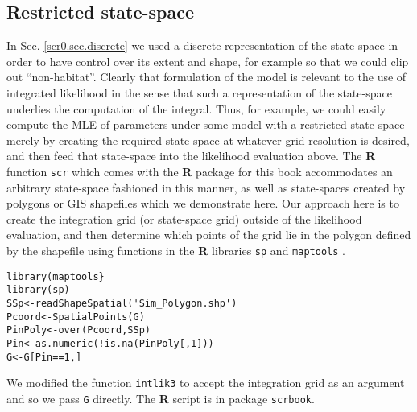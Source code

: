\subsection{Restricted state-space}
\label{mle.sec.shapefile}

In Sec. \ref{scr0.sec.discrete} 
 we used a discrete representation of
the state-space in order to have control over its extent and shape,
for example so that we could clip out ``non-habitat''. Clearly that
formulation of the model is relevant to the use of integrated
likelihood in the sense that such a representation of the state-space
underlies the computation of the integral. Thus, for example, we could
easily compute the MLE of parameters under some model with a
restricted state-space merely by creating the required state-space at
whatever grid resolution is desired, and then feed that state-space
into the likelihood evaluation above. The {\bf R} function \mbox{\tt scr}
which comes with the {\bf R} package for this book accommodates an
arbitrary state-space fashioned in this manner, as well as
state-spaces created by polygons or GIS shapefiles  which we
demonstrate here. Our approach here is to create the integration grid
(or state-space grid) outside of the likelihood evaluation, and then
determine which points of the grid lie in the polygon defined by the
shapefile using 
functions in the {\bf R} libraries \mbox{\tt sp}  and
\mbox{\tt maptools}  .
{\small
\begin{verbatim}
library(maptools}
library(sp)
SSp<-readShapeSpatial('Sim_Polygon.shp')
Pcoord<-SpatialPoints(G)
PinPoly<-over(Pcoord,SSp)
Pin<-as.numeric(!is.na(PinPoly[,1]))
G<-G[Pin==1,]
\end{verbatim}
}
We modified the function \mbox{\tt intlik3} to accept the integration
grid as an argument and so we pass \mbox{\tt G} directly. The {\bf R} 
script is in package \mbox{\tt scrbook}.

